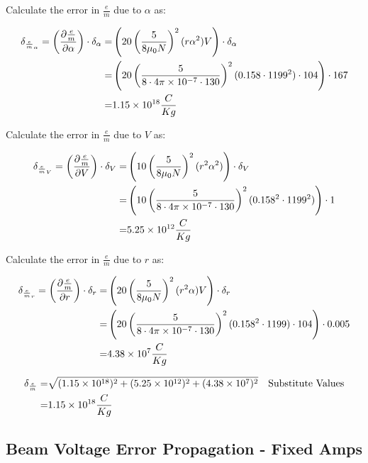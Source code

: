 \documentclass[12pt]{article}
\newcommand{\paren}[1]{\left( {#1} \right)}
\begin{document}
Calculate the error in $\frac{e}{m}$ due to $\alpha$ as:

\begin{align}
	\delta_{\frac{e}{m}_\alpha} = \paren{\frac{\partial \frac{e}{m}}{\partial \alpha}}\cdot\delta_\alpha =& \paren{20\paren{\frac{5}{8\mu_0N}}^2(r\alpha^2)V}\cdot\delta_\alpha \label{e:FixV_err_alpha} \\
	=& \paren{20\paren{\frac{5}{8\cdot4\pi\times10^{-7}\cdot130}}^2(0.158\cdot1199^2)\cdot104}\cdot167 \notag \\
	=& 1.15\times10^{18} \frac{C}{Kg} \notag
\end{align}

Calculate the error in $\frac{e}{m}$ due to $V$ as:

\begin{align}
	\delta_{\frac{e}{m}_V} = \paren{\frac{\partial \frac{e}{m}}{\partial V}}\cdot\delta_V =& \paren{10\paren{\frac{5}{8\mu_0N}}^2(r^2\alpha^2)}\cdot \delta_V \label{e:FixV_err_V} \\
	=& \paren{10\paren{\frac{5}{8\cdot4\pi\times10^{-7}\cdot130}}^2(0.158^2\cdot1199^2)}\cdot1 \notag \\
	=& 5.25\times10^{12} \frac{C}{Kg} \notag
\end{align}

Calculate the error in $\frac{e}{m}$ due to $r$ as:

\begin{align}
	\delta_{\frac{e}{m}_r} = \paren{\frac{\partial \frac{e}{m}}{\partial r}}\cdot\delta_r =& \paren{20\paren{\frac{5}{8\mu_0N}}^2(r^2\alpha)V}\cdot \delta_r \label{e:Fix_err_r} \\
	=& \paren{20\paren{\frac{5}{8\cdot4\pi\times10^{-7}\cdot130}}^2(0.158^2\cdot1199)\cdot104}\cdot0.005 \notag \\
	=& 4.38\times10^7 \frac{C}{Kg} \notag
\end{align}

\begin{align}
	\delta_\frac{e}{m} =& \sqrt{(1.15\times10^{18})^2+(5.25\times10^{12})^2+(4.38\times10^7)^2} && \text{Substitute Values} \notag \\
	=& 1.15\times10^{18} \frac{C}{Kg} \label{v:FixV_err}
\end{align}

\clearpage

\subsection{Beam Voltage Error Propagation - Fixed Amps} \label{sec:FixedAmpsErr}
\end{document}
